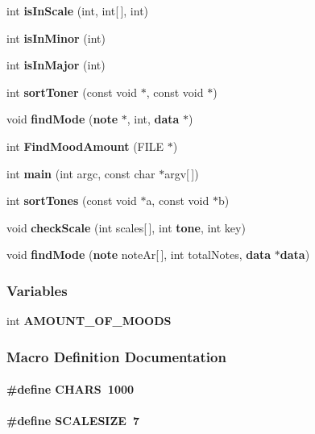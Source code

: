 \begin{DoxyCompactItemize}
int {\bf is\+In\+Scale} (int, int[$\,$], int)
\item 
int {\bf is\+In\+Minor} (int)
\item 
int {\bf is\+In\+Major} (int)
\item 
int {\bf sort\+Toner} (const void $\ast$, const void $\ast$)
\item 
void {\bf find\+Mode} ({\bf note} $\ast$, int, {\bf data} $\ast$)
\item 
int {\bf Find\+Mood\+Amount} (F\+I\+L\+E $\ast$)
\item 
int {\bf main} (int argc, const char $\ast$argv[$\,$])
\item 
int {\bf sort\+Tones} (const void $\ast$a, const void $\ast$b)
\item 
void {\bf check\+Scale} (int scales[$\,$], int {\bf tone}, int key)
\item 
void {\bf find\+Mode} ({\bf note} note\+Ar[$\,$], int total\+Notes, {\bf data} $\ast${\bf data})
\end{DoxyCompactItemize}
\subsubsection*{Variables}
\begin{DoxyCompactItemize}
\item 
int {\bf A\+M\+O\+U\+N\+T\+\_\+\+O\+F\+\_\+\+M\+O\+O\+D\+S}
\end{DoxyCompactItemize}


\subsubsection{Macro Definition Documentation}
\paragraph[{C\+H\+A\+R\+S}]{\setlength{\rightskip}{0pt plus 5cm}\#define C\+H\+A\+R\+S~1000}\label{main_8c_a5d7cfaaf3d71eb89b31364adb9fda6a6}
\paragraph[{S\+C\+A\+L\+E\+S\+I\+Z\+E}]{\setlength{\rightskip}{0pt plus 5cm}\#define S\+C\+A\+L\+E\+S\+I\+Z\+E~7}\label{main_8c_a3c7b5c7d1b09d118aa63ec87e3c73a8b}


